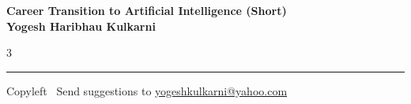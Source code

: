 \documentclass[8pt,landscape]{article}
\begin{document}
\footnotesize


\begin{center}
\Large{\textbf{Career Transition to Artificial Intelligence (Short)\\ Yogesh Haribhau Kulkarni}}
\end{center}

\begin{multicols}{3}


\end{multicols}

\rule{\linewidth}{0.25pt}
\scriptsize
Copyleft \textcopyleft\  Send suggestions to
\href{http://www.yogeshkulkarni.com}{yogeshkulkarni@yahoo.com}
\end{document}
